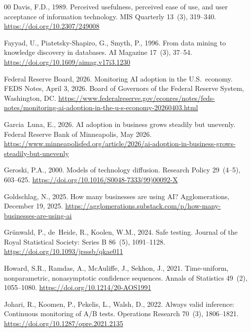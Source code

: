 \documentclass[review,authoryear,12pt]{elsarticle}
\begin{document}
\begin{thebibliography}{00}
Davis, F.D., 1989. Perceived usefulness, perceived ease of use, and user acceptance of information technology. MIS Quarterly 13~(3), 319--340. \url{https://doi.org/10.2307/249008}

Fayyad, U., Piatetsky-Shapiro, G., Smyth, P., 1996. From data mining to knowledge discovery in databases. AI Magazine 17~(3), 37--54. \url{https://doi.org/10.1609/aimag.v17i3.1230}

Federal Reserve Board, 2026. Monitoring AI adoption in the U.S.\ economy. FEDS Notes, April 3, 2026. Board of Governors of the Federal Reserve System, Washington, DC. \url{https://www.federalreserve.gov/econres/notes/feds-notes/monitoring-ai-adoption-in-the-u-s-economy-20260403.html}

Garcia~Luna, E., 2026. AI adoption in business grows steadily but unevenly. Federal Reserve Bank of Minneapolis, May 2026. \url{https://www.minneapolisfed.org/article/2026/ai-adoption-in-business-grows-steadily-but-unevenly}

Geroski, P.A., 2000. Models of technology diffusion. Research Policy 29~(4--5), 603--625. \url{https://doi.org/10.1016/S0048-7333(99)00092-X}

Goldschlag, N., 2025. How many businesses are using AI? Agglomerations, December 19, 2025. \url{https://agglomerations.substack.com/p/how-many-businesses-are-using-ai}

Gr\"unwald, P., de~Heide, R., Koolen, W.M., 2024. Safe testing. Journal of the Royal Statistical Society: Series B 86~(5), 1091--1128. \url{https://doi.org/10.1093/jrsssb/qkae011}

Howard, S.R., Ramdas, A., McAuliffe, J., Sekhon, J., 2021. Time-uniform, nonparametric, nonasymptotic confidence sequences. Annals of Statistics 49~(2), 1055--1080. \url{https://doi.org/10.1214/20-AOS1991}

Johari, R., Koomen, P., Pekelis, L., Walsh, D., 2022. Always valid inference: Continuous monitoring of A/B tests. Operations Research 70~(3), 1806--1821. \url{https://doi.org/10.1287/opre.2021.2135}


\end{thebibliography}
\end{document}
